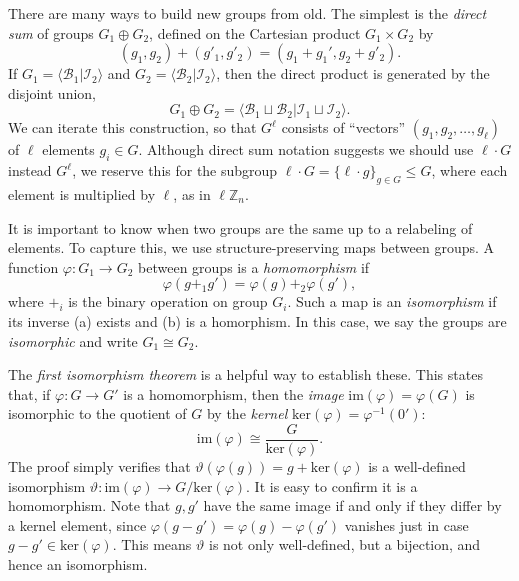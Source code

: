 \documentclass[aps, pre,reprint,nofootinbib,citeautoscript,floatfix]{revtex4-1}
\begin{document}
There are many ways to build new groups from old.
The simplest is the \emph{direct sum} of groups $G_1 \oplus G_2$, defined on the Cartesian
product $G_1 \times G_2$ by
\begin{equation}
  \label{eq:70}
  (g_1, g_2) + (g'_1, g'_2) = (g_1+g_1', g_2+g'_2).
\end{equation}
If $G_1 = \langle\mathcal{B}_1 | \mathcal{I}_2\rangle$ and $G_2 =
\langle\mathcal{B}_2|\mathcal{I}_2\rangle$, then the direct product is
generated by the disjoint union,
\begin{equation}
  \label{eq:71}
  G_1 \oplus G_2 = \langle \mathcal{B}_1 \sqcup \mathcal{B}_2 |
  \mathcal{I}_1 \sqcup \mathcal{I}_2\rangle.
\end{equation}
We can iterate this construction, so that $G^\ell$
consists of
``vectors'' $(g_1, g_2, \ldots, g_\ell)$ of $\ell$ elements $g_i \in
G$.
Although direct sum notation suggests we should
  use $\ell \cdot G$ instead $G^\ell$, we reserve this for the
  subgroup $\ell \cdot G = \{\ell \cdot g\}_{g\in G} \leq G$, where
  each element is multiplied by $\ell$, as in $\ell \mathbb{Z}_n$.

It is important to know when two groups are the same up to a
relabeling of elements.
To capture this, we use structure-preserving maps between groups.
A function $\varphi: G_1 \to G_2$ between groups is a \emph{homomorphism} if
\begin{equation}
  \label{eq:73}
  \varphi(g+_1g')=  \varphi(g)+_2 \varphi(g'),
\end{equation}
where $+_i$ is the binary operation on group $G_i$.
Such a map is an \emph{isomorphism} if its inverse (a) exists and (b)
is a homorphism.
In this case, we say the groups are \emph{isomorphic} and write $G_1
\cong G_2$.

The \emph{first
isomorphism theorem} is a helpful way to establish these. This states that, if $\varphi: G \to  G'$ is a
homomorphism, then the \emph{image} $\text{im}(\varphi) = \varphi(G)$ is isomorphic to the
quotient of $G$ by the \emph{kernel} $\text{ker}(\varphi) = \varphi^{-1}(0')$:
\begin{equation}
  \label{eq:fit}
  \text{im}(\varphi) \cong \frac{G}{\text{ker}(\varphi)}.
\end{equation}
The proof simply verifies that
$\vartheta(\varphi(g)) = g + \text{ker}(\varphi)$ is a well-defined
isomorphism $\vartheta: \text{im}(\varphi)\to G/\text{ker}(\varphi)$.
It is easy to confirm it is a homomorphism.
Note that $g, g'$ have the same image if and only if they differ by a kernel element, since $\varphi(g-g') =
\varphi(g)-\varphi(g')$ vanishes just in case $g - g' \in
\text{ker}(\varphi)$.
This means $\vartheta$ is not only well-defined, but a bijection, and
hence an isomorphism.
\end{document}
